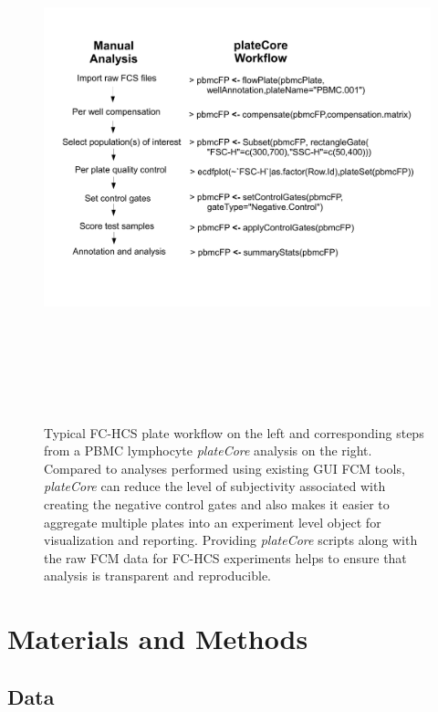 \documentclass[12pt]{article}
\newcommand{\Rpackage}[1]{{\textit{#1}}}
\begin{document}
\begin{figure}
\centering
\includegraphics[width=7in,height=6in]{analysisSteps.pdf}
\caption{Typical FC-HCS plate workflow on the left and corresponding steps from
a PBMC lymphocyte \Rpackage{plateCore} analysis on the right. Compared to
analyses performed using existing GUI FCM tools, \Rpackage{plateCore} can
reduce the level of subjectivity associated with creating the negative control
gates and also makes it easier to aggregate multiple plates into an experiment
level object for visualization and reporting. Providing \Rpackage{plateCore}
scripts along with the raw FCM data for FC-HCS experiments helps to ensure that
analysis is transparent and reproducible.}
\label{fig:analysis}
\end{figure}
 
\clearpage
\section*{Materials and Methods}
\subsection*{Data}
\end{document}
